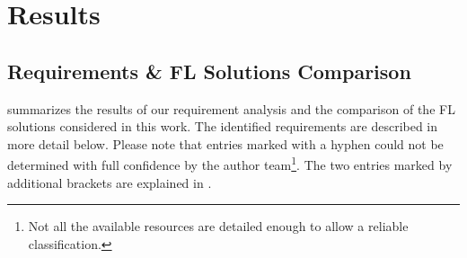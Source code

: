 \section{Results}
\label{sec:Results}

\subsection{Requirements \& FL Solutions Comparison}
\label{subsec:ResultsRequirements}

 summarizes the results of our requirement analysis and the comparison of the FL solutions considered in this work. The identified requirements are described in more detail below. Please note that entries marked with a hyphen could not be determined with full confidence by the author team\footnote{Not all the available resources are detailed enough to allow a reliable classification.}.
The two entries marked by additional brackets are explained in .


